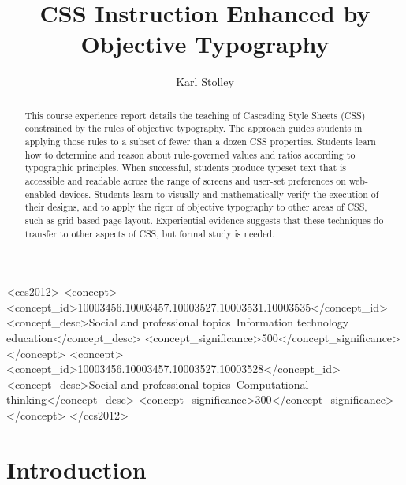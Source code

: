 \documentclass[sigplan,screen]{acmart}
\begin{document}
\title[Objective Typography]{CSS Instruction Enhanced by Objective Typography}

\author{Karl Stolley}

\begin{abstract}
This course experience report details the teaching of Cascading Style Sheets (CSS) constrained by the rules of objective typography. The approach guides students in applying those rules to a subset of fewer than a dozen CSS properties. Students learn how to determine and reason about rule-governed values and ratios according to typographic principles. When successful, students produce typeset text that is accessible and readable across the range of screens and user-set preferences on web-enabled devices. Students learn to visually and mathematically verify the execution of their designs, and to apply the  rigor of objective typography to other areas of CSS, such as grid-based page layout. Experiential evidence suggests that these techniques do transfer to other aspects of CSS, but formal study is needed.
\end{abstract}

\begin{CCSXML}
<ccs2012>
<concept>
  <concept_id>10003456.10003457.10003527.10003531.10003535</concept_id>
  <concept_desc>Social and professional topics~Information technology education</concept_desc>
  <concept_significance>500</concept_significance>
</concept>
<concept>
  <concept_id>10003456.10003457.10003527.10003528</concept_id>
  <concept_desc>Social and professional topics~Computational thinking</concept_desc>
  <concept_significance>300</concept_significance>
</concept>
</ccs2012>
\end{CCSXML}




\maketitle

\section{Introduction}
\end{document}
